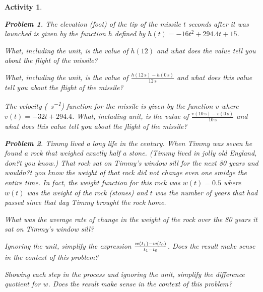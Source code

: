 \documentclass[12pt]{article}
\theoremstyle{activity}
\newtheorem{activity}{Activity}
\theoremstyle{problem}
\newtheorem{problem}{Problem}
\theoremstyle{example}
\theoremstyle{definition}
\theoremstyle{exercises}
\theoremstyle{exercise}
\begin{document}
\begin{activity}
\begin{problem}
The elevation (\si{foot}) of the tip of the missile $t$ seconds after it was launched is given by the function $h$ defined by $h(t)=-16t^2+294.4t+15$. 
\begin{parts}
\item What, including the unit, is the value of $h(12)$ and what does the value tell you about the flight of the missile? 
\item What, including the unit, is the value of $\frac{h(\SI{12}{\second})-h(\SI{0}{\second})}{\SI{12}{\second}}$ and what does this value tell you about the flight of the missile? 
\item  The velocity (\si{\foot\per\second}) function for the missile is given by the function $v$ where $v(t)=-32t+294.4$. What, including unit, is the value of $\frac{v(\SI{10}{\second})-v(\SI{0}{\second})}{\SI{10}{\second}}$ and what does this value tell you about the flight of the missile? 
\end{parts}
\end{problem}

\begin{problem}
Timmy lived a long life in the  century. When Timmy was seven he found a rock that weighed exactly half a stone. (Timmy lived in jolly old England, don?t you know.) That rock sat on Timmy's window sill for the next 80 years and wouldn?t you know the weight of that rock did not change even one smidge the entire time. In fact, the weight function for this rock was $w(t)=0.5$ where $w(t)$ was the weight of the rock (stones) and $t$ was the number of years that had passed since that day Timmy brought the rock home. 
\begin{parts}
\item What was the average rate of change in the weight of the rock over the 80 years it sat on Timmy's window sill? 
\item Ignoring the unit, simplify the expression $\frac{w\mleft(t_1\mright)-w\mleft(t_0\mright)}{t_1-t_0}$. Does the result make sense in
the context of this problem?
\item Showing each step in the process and ignoring the unit, simplify the difference quotient for $w$. Does the result make sense in
the context of this problem?
\end{parts}
\end{problem}


\end{activity}
\end{document}
